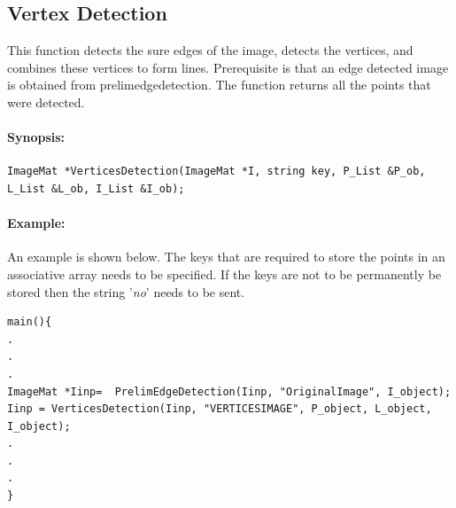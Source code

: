 \subsection{Vertex Detection}
 This function detects the sure edges of the image, detects the vertices, and combines these vertices to form lines. Prerequisite is that an edge detected image is obtained from prelimedgedetection. The function returns all the points that were detected.
\paragraph{Synopsis:}
\begin{lstlisting}
ImageMat *VerticesDetection(ImageMat *I, string key, P_List &P_ob, L_List &L_ob, I_List &I_ob);
\end{lstlisting}
\paragraph{Example:}
 An example is shown below. The keys that are required to store the points in an associative array needs to be specified. If the keys are not to be permanently be stored then the string '\textit{no}' needs to be sent.
\begin{lstlisting}
main(){ 
.
.
.
ImageMat *Iinp=  PrelimEdgeDetection(Iinp, "OriginalImage", I_object);
Iinp = VerticesDetection(Iinp, "VERTICESIMAGE", P_object, L_object, I_object);
.
.
.
}
\end{lstlisting}
